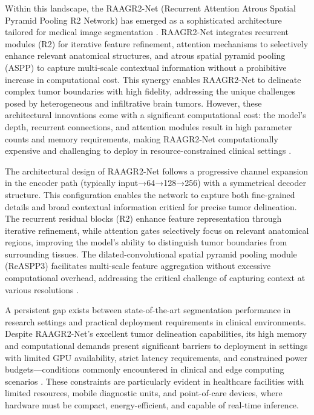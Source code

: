 \documentclass[12pt,a4paper]{article}
\begin{document}
Within this landscape, the RAAGR2-Net (Recurrent Attention Atrous Spatial Pyramid Pooling R2 Network) has emerged as a sophisticated architecture tailored for medical image segmentation \citep{Rehman2023RAAGR2}. RAAGR2-Net integrates recurrent modules (R2) for iterative feature refinement, attention mechanisms to selectively enhance relevant anatomical structures, and atrous spatial pyramid pooling (ASPP) to capture multi-scale contextual information without a prohibitive increase in computational cost. This synergy enables RAAGR2-Net to delineate complex tumor boundaries with high fidelity, addressing the unique challenges posed by heterogeneous and infiltrative brain tumors. However, these architectural innovations come with a significant computational cost: the model's depth, recurrent connections, and attention modules result in high parameter counts and memory requirements, making RAAGR2-Net computationally expensive and challenging to deploy in resource-constrained clinical settings \citep{Rehman2023RAAGR2, Wang2023Review, Mazurek2024}.

The architectural design of RAAGR2-Net follows a progressive channel expansion in the encoder path (typically input→64→128→256) with a symmetrical decoder structure. This configuration enables the network to capture both fine-grained details and broad contextual information critical for precise tumor delineation. The recurrent residual blocks (R2) enhance feature representation through iterative refinement, while attention gates selectively focus on relevant anatomical regions, improving the model's ability to distinguish tumor boundaries from surrounding tissues. The dilated-convolutional spatial pyramid pooling module (ReASPP3) facilitates multi-scale feature aggregation without excessive computational overhead, addressing the critical challenge of capturing context at various resolutions \citep{Rehman2023RAAGR2}.

A persistent gap exists between state-of-the-art segmentation performance in research settings and practical deployment requirements in clinical environments. Despite RAAGR2-Net's excellent tumor delineation capabilities, its high memory and computational demands present significant barriers to deployment in settings with limited GPU availability, strict latency requirements, and constrained power budgets—conditions commonly encountered in clinical and edge computing scenarios \citep{Yang2025, Mazurek2024}. These constraints are particularly evident in healthcare facilities with limited resources, mobile diagnostic units, and point-of-care devices, where hardware must be compact, energy-efficient, and capable of real-time inference.
\end{document}
